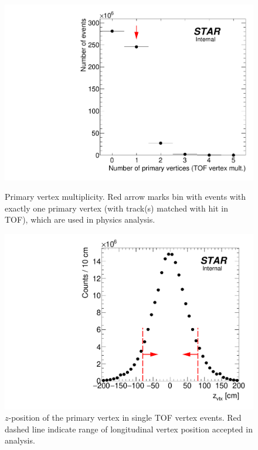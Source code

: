 \begin{figure}[ht!]%
\centering%
\begin{minipage}{.4725\textwidth}%
  \centering%
  \includegraphics[width=\linewidth]{graphics/eventSelection/NumberOfPrimaryVertices.pdf}%
  \caption{Primary vertex multiplicity. Red arrow marks bin with events with exactly one primary vertex (with track(s) matched with hit in TOF), which are used in physics analysis.}\label{fig:NumberOfPrimaryVertices}
\end{minipage}%
\quad\quad%
\begin{minipage}{.4725\textwidth}%
  \centering
  \includegraphics[width=\linewidth]{graphics/eventSelection/zVertex_oneTof.pdf}%
  \caption{\texorpdfstring{$z$}{z}-position of the primary vertex in single TOF vertex events. Red dashed line indicate range of longitudinal vertex position accepted in analysis.\newline}\label{fig:zVertexTpc}
\end{minipage}%
\end{figure}%


